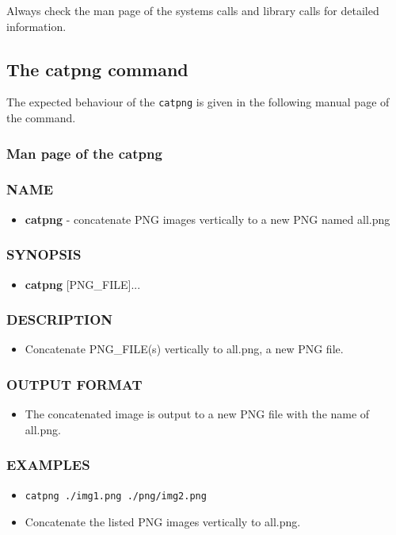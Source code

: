 Always check the man page of the systems calls and library calls for detailed information.


\subsection{The catpng command}

The expected behaviour of the \verb+catpng+ is given in the following manual page of the command.
\subsubsection{Man page of the catpng}
\subsubsection*{NAME}
  \begin{itemize}
    \item[]{\bf catpng} - concatenate PNG images vertically to a new PNG named all.png
  \end{itemize}
\subsubsection*{SYNOPSIS}
  \begin{itemize}
    \item[]{\bf catpng} [PNG\_FILE]... 
  \end{itemize}
\subsubsection*{DESCRIPTION}
  \begin{itemize}
  \item[]Concatenate PNG\_FILE(s) vertically to all.png, a new PNG file.
  \end{itemize}
\subsubsection*{OUTPUT FORMAT}
  \begin{itemize}
  \item[]The concatenated image is output to  a new PNG file with the name of all.png.
  \end{itemize}
\subsubsection*{EXAMPLES}
\begin{itemize}
\item[]
\begin{verbatim}
catpng ./img1.png ./png/img2.png
\end{verbatim}
\item[]Concatenate the listed PNG images vertically to all.png.
\end{itemize}

